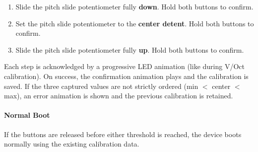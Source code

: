 \begin{enumerate}
	\item Slide the pitch slide potentiometer fully \textbf{down}. Hold both buttons to confirm.
	\item Set the pitch slide potentiometer to the \textbf{center detent}. Hold both buttons to confirm.
	\item Slide the pitch slide potentiometer fully \textbf{up}. Hold both buttons to confirm.
\end{enumerate}

Each step is acknowledged by a progressive LED animation (like during V/Oct calibration). 
On success, the confirmation animation plays and the calibration is saved. 
If the three captured values are not strictly ordered (min $<$ center $<$ max), an error animation is shown and the
previous calibration is retained.

\paragraph*{Normal Boot}

If the buttons are released before either threshold is reached, the device boots normally using the existing calibration data.